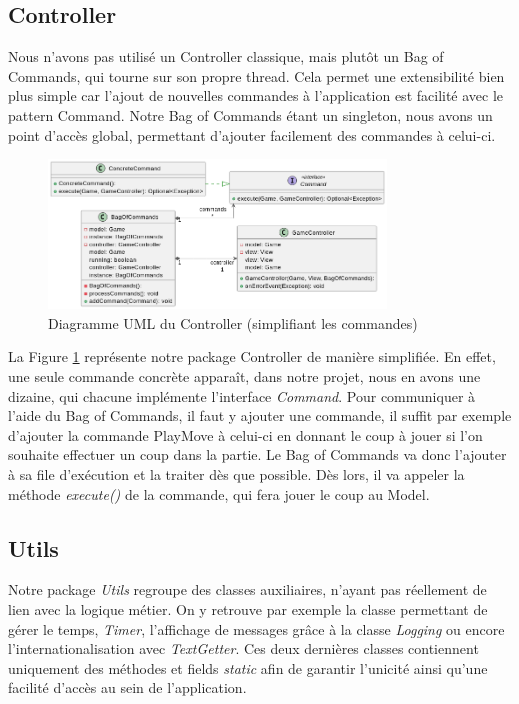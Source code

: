 \documentclass{article}
\begin{document}
\subsection{Controller}
Nous n'avons pas utilisé un Controller classique, mais plutôt un Bag of Commands, qui tourne sur son propre thread. Cela permet une extensibilité
bien plus simple car l'ajout de nouvelles commandes à l'application est facilité avec le pattern Command.
Notre Bag of Commands étant un singleton, nous avons un point d'accès global, permettant d'ajouter facilement des commandes à celui-ci.
\begin{figure}[h]
    \centering
    \includegraphics[width=0.8\textwidth]{uml_controller}
    \caption{Diagramme UML du Controller (simplifiant les commandes)}
    \label{umlController}
\end{figure}
\FloatBarrier
La Figure \ref{umlController} représente notre package Controller de manière simplifiée. 
En effet, une seule commande concrète apparaît, dans notre projet,
nous en avons une dizaine, qui chacune implémente l'interface \textit{Command}.
Pour communiquer à l'aide du Bag of Commands, il faut y ajouter une commande, il suffit par exemple d'ajouter la commande PlayMove à celui-ci en donnant le coup à jouer si l'on souhaite effectuer un coup dans la partie.
Le Bag of Commands va donc l'ajouter à sa file d'exécution et la traiter dès que possible. Dès lors, il va appeler la méthode \textit{execute()} de la commande, qui fera jouer le coup au Model.

\subsection{Utils}
Notre package \textit{Utils} regroupe des classes auxiliaires, n'ayant pas réellement de lien avec la logique métier.
On y retrouve par exemple la classe permettant de gérer le temps, \textit{Timer}, l'affichage de messages grâce à la classe \textit{Logging}
ou encore l'internationalisation avec \textit{TextGetter}. Ces deux dernières classes contiennent uniquement des méthodes et fields \textit{static}
afin de garantir l'unicité ainsi qu'une facilité d'accès au sein de l'application.
\end{document}

